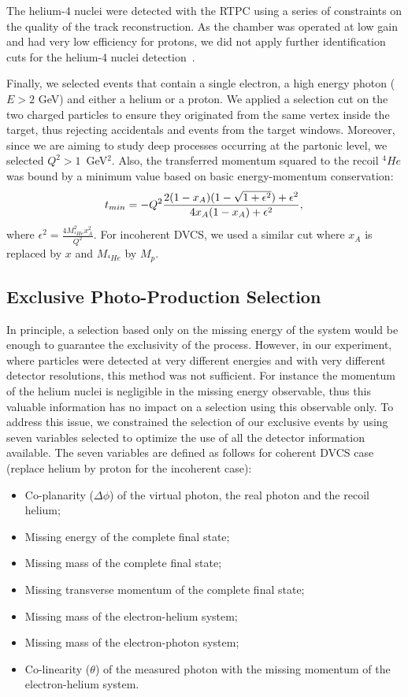 \documentclass[aps,prc,preprint,superscriptaddress]{revtex4}
\begin{document}
The helium-4 nuclei were detected with the RTPC using a series of constraints on the quality
of the track reconstruction. As the chamber was operated at low gain and had very low efficiency 
for protons, we did not apply further identification cuts for the helium-4 nuclei 
detection~\cite{Dupre:2017upj}.

Finally, we selected events that contain a single electron, a high energy photon ($E>2$ GeV) and
either a helium or a proton. We applied a selection cut on the two charged particles 
to ensure they originated from the same vertex inside the target, thus rejecting accidentals and
events from the target windows.
Moreover, since we are aiming to study deep processes occurring at the partonic level, we selected
$Q^2>1$~GeV$^2$. Also, the transferred momentum squared to the recoil $^{4}He$ was bound by
   a minimum value based on basic energy-momentum conservation:
\begin{equation}
   t_{min} = - Q^{2} \frac{2(1- x_{A})(1 - \sqrt{1 + \epsilon ^{2}}) + \epsilon 
   ^{2}}{4 x_{A}(1-x_{A})+ \epsilon ^{2}},\\
\end{equation}
where $\epsilon ^{2} = \frac{4M^{2}_{^4\!He}x^{2}_{A}}{Q^{2}}$. For incoherent DVCS, 
we used a similar cut where $x_A$ is replaced by $x$ and $M_{^4\!He}$ by $M_{p}$. 

\subsection{Exclusive Photo-Production Selection}

In principle, 
a selection based only on the missing energy of the system would be
enough to guarantee the 
exclusivity of the process. However, in our experiment, where particles 
were detected at very different energies and with very different detector 
resolutions, this method was not sufficient. For instance the momentum 
of the helium nuclei is negligible in the missing energy observable, thus
this valuable information has no impact on a selection using this observable only.
To address this issue, we constrained the selection of our exclusive events by using seven 
variables selected to optimize the use of all the detector information available. 
The seven variables are defined as follows for coherent 
DVCS case (replace helium by proton for the incoherent case):
\begin{itemize}
	\item Co-planarity ($\Delta \phi$) of the virtual photon, the real photon and
		the recoil helium;
	\item Missing energy of the complete final state;
	\item Missing mass of the complete final state;
	\item Missing transverse momentum of the complete final state;
	\item Missing mass of the electron-helium system;
	\item Missing mass of the electron-photon system;
	\item Co-linearity ($\theta$) of the measured photon with the missing momentum of the 
		electron-helium system.
\end{itemize}
\end{document}
